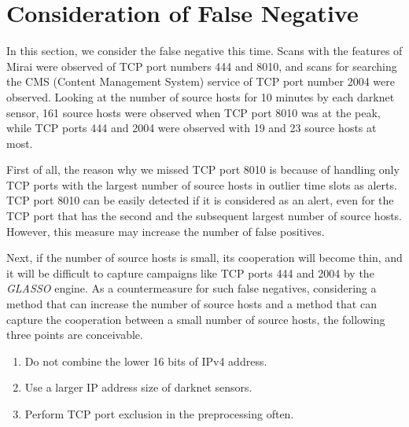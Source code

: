 \documentclass[conference]{IEEEtran}
\begin{document}
\section{Consideration of False Negative}
\label{Consideration}
In this section, we consider the false negative this time.
Scans with the features of Mirai were observed of TCP port numbers 444 and 8010, and scans for searching the CMS (Content Management System) service of TCP port number 2004 were observed.
Looking at the number of source hosts for 10 minutes by each darknet sensor, 161 source hosts were observed when TCP port 8010 was at the peak, while TCP ports 444 and 2004 were observed with 19 and 23 source hosts at most.


First of all, the reason why we missed TCP port 8010 is because of handling only TCP ports with the largest number of source hosts in outlier time slots as alerts.
TCP port 8010 can be easily detected if it is considered as an alert, even for the TCP port that has the second and the subsequent largest number of source hosts.
However, this measure may increase the number of false positives.



Next, if the number of source hosts is small, its cooperation will become thin, and it will be difficult to capture campaigns like TCP ports 444 and 2004 by the \textit{GLASSO} engine.
As a countermeasure for such false negatives, considering a method that can increase the number of source hosts and a method that can capture the cooperation between a small number of source hosts, the following three points are conceivable.
\begin{enumerate}
  \item Do not combine the lower 16 bits of IPv4 address.
  \item Use a larger IP address size of darknet sensors.
  \item Perform TCP port exclusion in the preprocessing often.
\end{enumerate}
\end{document}
